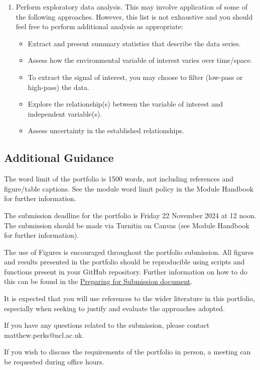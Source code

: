 \documentclass[11pt,onecolumn,a4paper,notitlepage]{article}
\begin{document}
\begin{enumerate}[resume]
\item{Perform exploratory data analysis. This may involve application of some of the following approaches. However, this list is not exhaustive and you should feel free to perform additional analysis as appropriate:} 

\begin{itemize}
\item{Extract and present summary statistics that describe the data series.}
\item{Assess how the environmental variable of interest varies over time/space.}
\item{To extract the signal of interest, you may choose to filter (low-pass or high-pass) the data.}
\item{Explore the relationship(s) between the variable of interest and independent variable(s).}
\item{Assess uncertainty in the established relationships.}
\end{itemize}

\end{enumerate}


\subsection*{Additional Guidance}

\noindent The word limit of the portfolio is 1500 words, not including references and figure/table captions. See the module word limit policy in the Module Handbook for further information.
\bigskip

\noindent 
The submission deadline for the portfolio is Friday 22 November 2024 at 12 noon. The submission should be made via Turnitin on Canvas (see Module Handbook for further information).
\bigskip

\noindent 
The use of Figures is encouraged throughout the portfolio submission. All figures and results presented in the portfolio should be reproducible using scripts and functions present in your GitHub repository. Further information on how to do this can be found in the \href{}{Preparing for Submission document}.
\bigskip

\noindent 
It is expected that you will use references to the wider literature in this portfolio, especially when seeking to justify and evaluate the approaches adopted.
\bigskip

\noindent If you have any questions related to the submission, please contact matthew.perks@ncl.ac.uk.

\bigskip

\noindent 
If you wish to discuss the requirements of the portfolio in person, a meeting can be requested during office hours.
\end{document}
